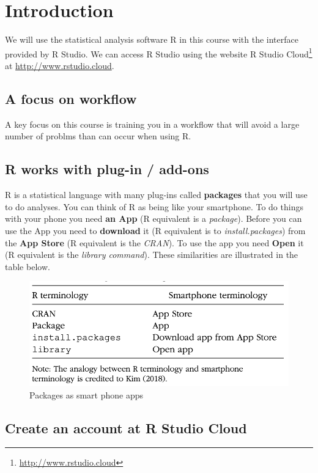 \documentclass[
]{krantz}
\renewcommand{\href}[2]{#2\footnote{\url{#1}}}
\begin{document}
\mainmatter

\hypertarget{introduction}{%
\chapter{Introduction}\label{introduction}}

We will use the statistical analysis software R in this course with the interface provided by R Studio. We can access R Studio using the website \href{http://www.rstudio.cloud}{R Studio Cloud} at \url{http://www.rstudio.cloud}.

\hypertarget{a-focus-on-workflow}{%
\section{A focus on workflow}\label{a-focus-on-workflow}}

A key focus on this course is training you in a workflow that will avoid a large number of problms than can occur when using R.

\hypertarget{r-works-with-plug-in-add-ons}{%
\section{R works with plug-in / add-ons}\label{r-works-with-plug-in-add-ons}}

R is a statistical language with many plug-ins called \textbf{packages} that you will use to do analyses. You can think of R as being like your smartphone. To do things with your phone you need \textbf{an App} (R equivalent is a \emph{package}). Before you can use the App you need to \textbf{download} it (R equivalent is to \emph{install.packages}) from the \textbf{App Store} (R equivalent is the \emph{CRAN}). To use the app you need \textbf{Open} it (R equivalent is the \emph{library command}). These similarities are illustrated in the table below.

\begin{figure}
\includegraphics[width=0.5\linewidth]{first_time/images/smartphone_analogy} \caption{Packages as smart phone apps}\label{fig:unnamed-chunk-3}
\end{figure}

\hypertarget{create-an-account-at-r-studio-cloud}{%
\section{Create an account at R Studio Cloud}\label{create-an-account-at-r-studio-cloud}}
\end{document}
